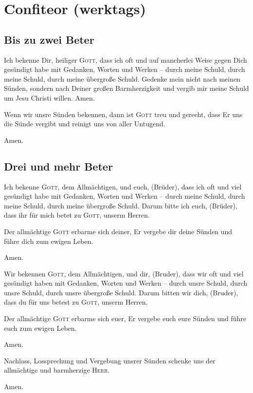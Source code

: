 \section*{Confiteor (werktags)}
\begin{multicols}{2}\setlength{\columnseprule}{0.2pt}
\subsection*{Bis zu zwei Beter}
\Abar Ich bekenne Dir, heiliger \textsc{Gott}, dass ich oft und auf mancherlei Weise gegen Dich gesündigt habe mit Gedanken, Worten und Werken -- durch meine Schuld, durch meine Schuld, durch meine übergroße Schuld. Gedenke mein nicht nach meinen Sünden, sondern nach Deiner großen Barmherzigkeit und vergib mir meine Schuld um Jesu Christi willen. Amen.\par
\Vbar Wenn wir unsre Sünden bekennen, dann ist \textsc{Gott} treu und gerecht, dass Er uns die Sünde vergibt und reinigt uns von aller Untugend.\par
\Abar Amen.\par
\vfill\columnbreak
\subsection*{Drei und mehr Beter} \Vbar Ich bekenne \textsc{Gott}, dem Allmächtigen, und euch, (Brüder), dass ich oft und viel gesündigt habe mit Gedanken, Worten und Werken -- durch meine Schuld, durch meine Schuld, durch meine übergroße Schuld. Darum bitte ich euch, (Brüder), dass ihr für mich betet zu \textsc{Gott}, unserm Herren.\par
\Rbar Der allmächtige \textsc{Gott} erbarme sich deiner, Er vergebe dir deine Sünden und führe dich zum ewigen Leben.\par
\Vbar Amen.\par
\Rbar Wir bekennen \textsc{Gott}, dem Allmächtigen, und dir, (Bruder), dass wir oft und viel gesündigt haben mit Gedanken, Worten und Werken -- durch unsre Schuld, durch unsre Schuld, durch unsre übergroße Schuld. Darum bitten wir dich, (Bruder), dass du für uns betest zu \textsc{Gott}, unserm Herren.\par
\Vbar Der allmächtige \textsc{Gott} erbarme sich euer, Er vergebe euch eure Sünden und führe euch zum ewigen Leben.\par
\Rbar Amen.\par
\Vbar Nachlass, Lossprechung und Vergebung unsrer Sünden schenke uns der allmächtige und barmherzige \textsc{Herr}.\par
\Rbar Amen.
\end{multicols}
